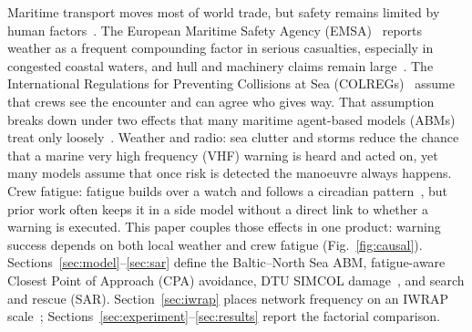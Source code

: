 \documentclass[cameraready]{Interspeech}
\begin{document}
Maritime transport moves most of world trade, but safety remains limited by human factors~\cite{rothblum2000}. The European Maritime Safety Agency (EMSA)~\cite{emsa2023} reports weather as a frequent compounding factor in serious casualties, especially in congested coastal waters, and hull and machinery claims remain large~\cite{iumi2023}. The International Regulations for Preventing Collisions at Sea (COLREGs)~\cite{colregs1972} assume that crews see the encounter and can agree who gives way. That assumption breaks down under two effects that many maritime agent-based models (ABMs) treat only loosely~\cite{tam2010,silveira2013,zhang2015}. Weather and radio: sea clutter and storms reduce the chance that a marine very high frequency (VHF) warning is heard and acted on, yet many models assume that once risk is detected the manoeuvre always happens. Crew fatigue: fatigue builds over a watch and follows a circadian pattern~\cite{chauvin2013}, but prior work often keeps it in a side model without a direct link to whether a warning is executed. This paper couples those effects in one product: warning success depends on both local weather and crew fatigue (Fig.~\ref{fig:causal}). Sections~\ref{sec:model}--\ref{sec:sar} define the Baltic--North Sea ABM, fatigue-aware Closest Point of Approach (CPA) avoidance, DTU SIMCOL damage~\cite{lutzen2001}, and search and rescue (SAR). Section~\ref{sec:iwrap} places network frequency on an IWRAP scale~\cite{friishansen2008iwrap}; Sections~\ref{sec:experiment}--\ref{sec:results} report the factorial comparison.
\end{document}
